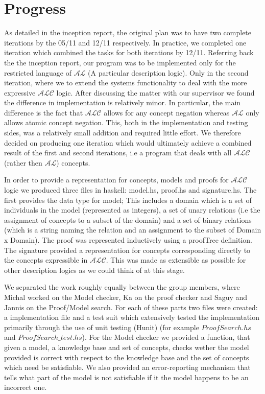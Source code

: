 \section*{Progress}

As detailed in the inception report, the original plan was to have two complete iterations by the 05/11 and 12/11 respectively. In practice, we completed one iteration which combined the tasks for both iterations by 12/11. Referring back the the inception report, our program was to be implemented only for the restricted language of $\mathcal{AL}$ (A particular description logic). Only in the second iteration, where we to extend the systems functionality to deal with the more expressive $\mathcal{ALC}$ logic. After discussing the matter with our supervisor we found the difference in implementation is relatively minor. In particular, the main difference is the fact that $\mathcal{ALC}$ allows for any concept negation whereas $\mathcal{AL}$ only allows atomic concept negation. This, both in the implementation and testing sides, was a relatively small addition and required little effort. We therefore decided on producing one iteration which would ultimately achieve a combined result of the first and second iterations, i.e a program that deals with all $\mathcal{ALC}$ (rather then $\mathcal{AL}$) concepts.

In order to provide a representation for concepts, models and proofs for $\mathcal{ALC}$ logic we produced three files in haskell: model.hs, proof.hs and signature.hs. The first provides the data type for model; This includes a domain which is a set of individuals in the model (represented as integers), a set of unary relations (i.e the assignment of concepts to a subset of the domain) and a set of binary relations (which is a string naming the relation and an assignment to the subset of Domain x Domain). The proof was represented inductively using a proofTree definition. The signature provided a representation for concepts corresponding directly to the concepts expressible in $\mathcal{ALC}$. This was made as extensible as possible for other description logics as we could think of at this stage. 

We separated the work roughly equally between the group members, where Michal worked on the Model checker, Ka on the proof checker and Saguy and Jannis on the Proof/Model search. For each of these parts two files were created: a implementation file and a test suit which extensively tested the implementation primarily through the use of unit testing (Hunit) (for example $ProofSearch.hs$ and $ProofSearch\_test.hs$). For the Model checker we provided a function, that given a model, a knowledge base and set of concepts, checks wether the model provided is correct with respect to the knowledge base and the set of concepts which need be satisfiable. We also provided an error-reporting mechanism that tells what part of the model is not satisfiable if it the model happens to be an incorrect one. 

